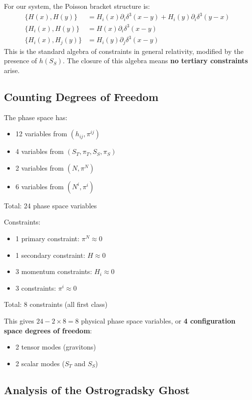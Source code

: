 \documentclass[12pt]{article}
\begin{document}
For our system, the Poisson bracket structure is:
\begin{align}
\{ H(x), H(y) \} &= H_i(x) \partial_i \delta^3(x-y) + H_i(y) \partial_i \delta^3(y-x) \\
\{ H_i(x), H(y) \} &= H(x) \partial_i \delta^3(x-y) \\
\{ H_i(x), H_j(y) \} &= H_i(y) \partial_j \delta^3(x-y)
\end{align}
This is the standard algebra of constraints in general relativity, modified by the presence of $h(S_S)$. The closure of this algebra means \textbf{no tertiary constraints} arise.

\subsection{Counting Degrees of Freedom}

The phase space has:
\begin{itemize}
    \item 12 variables from $(h_{ij}, \pi^{ij})$
    \item 4 variables from $(S_T, \pi_T, S_S, \pi_S)$
    \item 2 variables from $(N, \pi^N)$
    \item 6 variables from $(N^i, \pi^i)$
\end{itemize}
Total: 24 phase space variables

Constraints:
\begin{itemize}
    \item 1 primary constraint: $\pi^N \approx 0$
    \item 1 secondary constraint: $H \approx 0$
    \item 3 momentum constraints: $H_i \approx 0$
    \item 3 constraints: $\pi^i \approx 0$
\end{itemize}
Total: 8 constraints (all first class)

This gives $24 - 2\times8 = 8$ physical phase space variables, or \textbf{4 configuration space degrees of freedom}:
\begin{itemize}
    \item 2 tensor modes (gravitons)
    \item 2 scalar modes ($S_T$ and $S_S$)
\end{itemize}

\subsection{Analysis of the Ostrogradsky Ghost}
\end{document}
